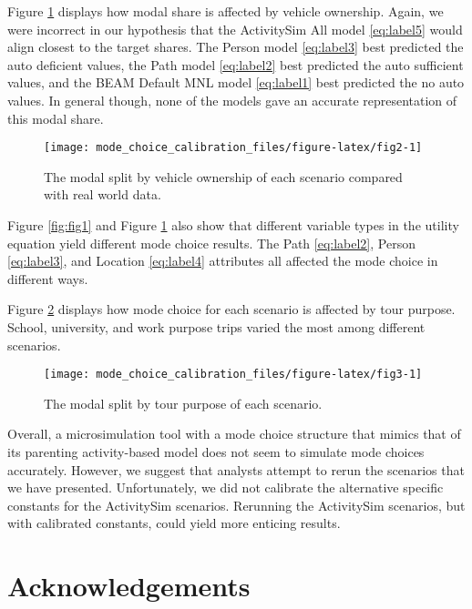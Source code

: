 \documentclass[]{elsarticle} %
\begin{document}
Figure \ref{fig:fig2} displays how modal share is affected by vehicle ownership. Again, we were incorrect in our hypothesis that the ActivitySim All model \eqref{eq:label5} would align closest to the target shares. The Person model \eqref{eq:label3} best predicted the auto deficient values, the Path model \eqref{eq:label2} best predicted the auto sufficient values, and the BEAM Default MNL model \eqref{eq:label1} best predicted the no auto values. In general though, none of the models gave an accurate representation of this modal share.

\begin{figure}

{\centering \texttt{[image: mode\_choice\_calibration\_files/figure-latex/fig2-1]} 

}

\caption{The modal split by vehicle ownership of each scenario compared with real world data.}\label{fig:fig2}
\end{figure}

Figure \ref{fig:fig1} and Figure \ref{fig:fig2} also show that different variable types in the utility equation yield different mode choice results. The Path \eqref{eq:label2}, Person \eqref{eq:label3}, and Location \eqref{eq:label4} attributes all affected the mode choice in different ways.

Figure \ref{fig:fig3} displays how mode choice for each scenario is affected by tour purpose. School, university, and work purpose trips varied the most among different scenarios.

\begin{figure}

{\centering \texttt{[image: mode\_choice\_calibration\_files/figure-latex/fig3-1]} 

}

\caption{The modal split by tour purpose of each scenario.}\label{fig:fig3}
\end{figure}

Overall, a microsimulation tool with a mode choice structure that mimics that of its parenting activity-based model does not seem to simulate mode choices accurately. However, we suggest that analysts attempt to rerun the scenarios that we have presented. Unfortunately, we did not calibrate the alternative specific constants for the ActivitySim scenarios. Rerunning the ActivitySim scenarios, but with calibrated constants, could yield more enticing results.

\hypertarget{acknowledgements}{%
\section{Acknowledgements}\label{acknowledgements}}
\end{document}
